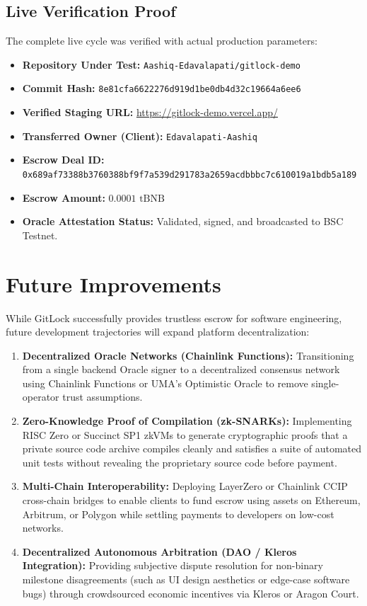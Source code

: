\documentclass[11pt,a4paper]{article}
\begin{document}
\subsection{Live Verification Proof}
The complete live cycle was verified with actual production parameters:
\begin{itemize}[noitemsep]
    \item \textbf{Repository Under Test:} \texttt{Aashiq-Edavalapati/gitlock-demo}
    \item \textbf{Commit Hash:} \texttt{8e81cfa6622276d919d1be0db4d32c19664a6ee6}
    \item \textbf{Verified Staging URL:} \url{https://gitlock-demo.vercel.app/}
    \item \textbf{Transferred Owner (Client):} \texttt{Edavalapati-Aashiq}
    \item \textbf{Escrow Deal ID:} \texttt{0x689af73388b3760388bf9f7a539d291783a2659acdbbbc7c610019a1bdb5a189}
    \item \textbf{Escrow Amount:} $0.0001\text{ tBNB}$
    \item \textbf{Oracle Attestation Status:} Validated, signed, and broadcasted to BSC Testnet.
\end{itemize}

\section{Future Improvements}
While GitLock successfully provides trustless escrow for software engineering, future development trajectories will expand platform decentralization:
\begin{enumerate}
    \item \textbf{Decentralized Oracle Networks (Chainlink Functions):} Transitioning from a single backend Oracle signer to a decentralized consensus network using Chainlink Functions or UMA's Optimistic Oracle to remove single-operator trust assumptions.
    \item \textbf{Zero-Knowledge Proof of Compilation (zk-SNARKs):} Implementing RISC Zero or Succinct SP1 zkVMs to generate cryptographic proofs that a private source code archive compiles cleanly and satisfies a suite of automated unit tests without revealing the proprietary source code before payment.
    \item \textbf{Multi-Chain Interoperability:} Deploying LayerZero or Chainlink CCIP cross-chain bridges to enable clients to fund escrow using assets on Ethereum, Arbitrum, or Polygon while settling payments to developers on low-cost networks.
    \item \textbf{Decentralized Autonomous Arbitration (DAO / Kleros Integration):} Providing subjective dispute resolution for non-binary milestone disagreements (such as UI design aesthetics or edge-case software bugs) through crowdsourced economic incentives via Kleros or Aragon Court.
\end{enumerate}
\end{document}
